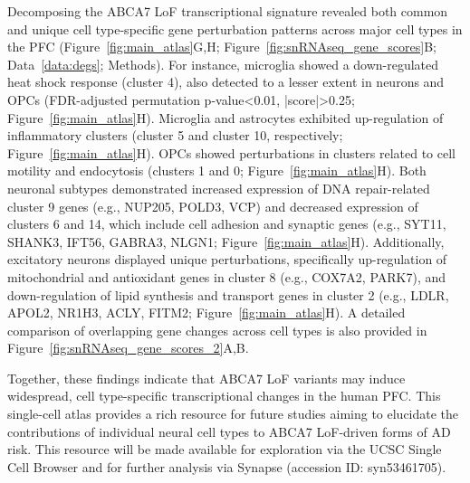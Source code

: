 Decomposing the ABCA7 LoF transcriptional signature revealed both common and unique cell type-specific gene perturbation patterns across major cell types in the PFC (Figure~\ref{fig:main_atlas}G,H; Figure~\ref{fig:snRNAseq_gene_scores}B; Data~\ref{data:degs}; Methods). For instance, microglia showed a down-regulated heat shock response (cluster 4), also detected to a lesser extent in neurons and OPCs (FDR-adjusted permutation p-value<0.01, |score|>0.25; Figure~\ref{fig:main_atlas}H). Microglia and astrocytes exhibited up-regulation of inflammatory clusters (cluster 5 and cluster 10, respectively; Figure~\ref{fig:main_atlas}H). OPCs showed perturbations in clusters related to cell motility and endocytosis (clusters 1 and 0; Figure~\ref{fig:main_atlas}H). Both neuronal subtypes demonstrated increased expression of DNA repair-related cluster 9 genes (e.g., NUP205, POLD3, VCP) and decreased expression of clusters 6 and 14, which include cell adhesion and synaptic genes (e.g., SYT11, SHANK3, IFT56, GABRA3, NLGN1; Figure~\ref{fig:main_atlas}H). Additionally, excitatory neurons displayed unique perturbations, specifically up-regulation of mitochondrial and antioxidant genes in cluster 8 (e.g., COX7A2, PARK7), and down-regulation of lipid synthesis and transport genes in cluster 2 (e.g., LDLR, APOL2, NR1H3, ACLY, FITM2; Figure~\ref{fig:main_atlas}H). A detailed comparison of overlapping gene changes across cell types is also provided in Figure~\ref{fig:snRNAseq_gene_scores_2}A,B.

Together, these findings indicate that ABCA7 LoF variants may induce widespread, cell type-specific transcriptional changes in the human PFC. This single-cell atlas provides a rich resource for future studies aiming to elucidate the contributions of individual neural cell types to ABCA7 LoF-driven forms of AD risk. This resource will be made available for exploration via the UCSC Single Cell Browser and for further analysis via Synapse (accession ID: syn53461705).

